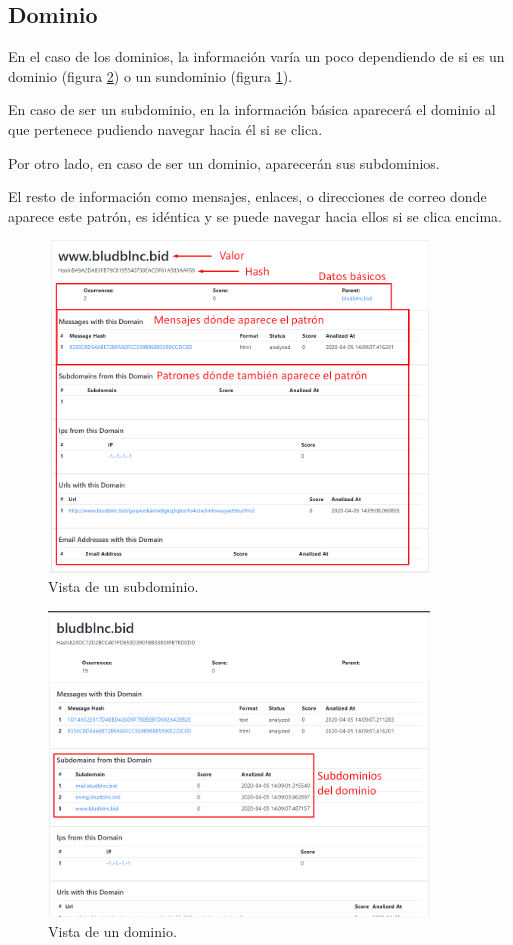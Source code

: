 \subsection{Dominio}
En el caso de los dominios, la información varía un poco dependiendo de si es un dominio (figura \ref{fig:dominio}) o un sundominio (figura \ref{fig:Subdominio}).

En caso de ser un subdominio, en la información básica aparecerá el dominio al que pertenece pudiendo navegar hacia él si se clica. 

Por otro lado, en caso de ser un dominio, aparecerán sus subdominios.

El resto de información como mensajes, enlaces, o direcciones de correo donde aparece este patrón, es idéntica y se puede navegar hacia ellos si se clica encima. 

\begin{figure}[htb]
    \centering
    \includegraphics[width=0.9\textwidth]{imagenes/capturasAplicacion/Subdominio.png}
\caption{Vista de un subdominio.}
\label{fig:Subdominio}
\end{figure}


\begin{figure}[htb]
    \centering
    \includegraphics[width=0.9\textwidth]{imagenes/capturasAplicacion/Dominio.png}
\caption{Vista de un dominio.}
\label{fig:dominio}
\end{figure}


